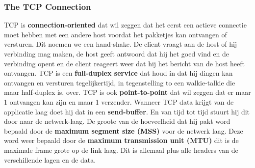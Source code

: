 \subsubsection{The TCP Connection}
TCP is \textbf{connection-oriented} dat wil zeggen dat het eerst een actieve connectie moet hebben met een andere
host voordat het pakketjes kan ontvangen of versturen. Dit noemen we een hand-shake. De client vraagt aan de host of
hij verbinding mag maken, de host geeft antwoord dat hij het goed vind en de verbinding opent en de client reageert
weer dat hij het bericht van de host heeft ontvangen.
\newline
TCP is een \textbf{full-duplex service} dat houd in dat hij dingen kan ontvangen en versturen tegelijkertijd, in
tegenstelling to een walkie-talkie die maar half-duplex is, over. TCP is ook \textbf{point-to-point} dat wil zeggen
dat er maar 1 ontvangen kan zijn en maar 1 verzender.
\newline
Wanneer TCP data krijgt van de applicatie laag doet hij dat in een \textbf{send-buffer}. En van tijd tot tijd stuurt
hij dit door naar de netwerk-laag. De groote van de hoeveelheid dat hij pakt word bepaald door de \textbf{maximum
segment size (MSS)} voor de netwerk laag. Deze word weer bepaald door de \textbf{maximum transmission unit (MTU)} dit
is de maximale frame grote op de link laag. Dit is allemaal plus alle headers van de verschillende lagen en de data.

